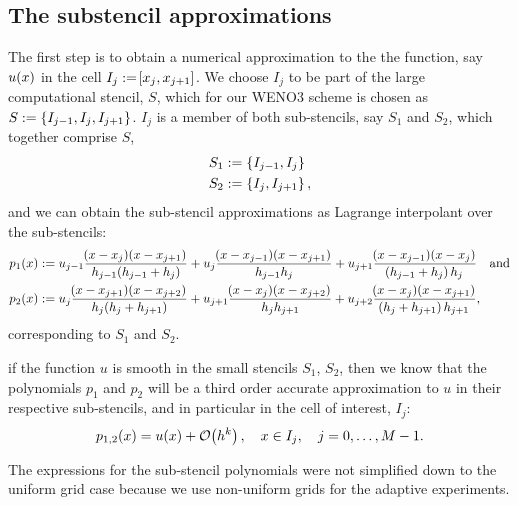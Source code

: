 \documentclass{amsart}
\theoremstyle{definition}
\theoremstyle{remark}
\numberwithin{equation}{section}
\begin{document}
	\subsection{The substencil approximations}
 The first step is to obtain a numerical approximation to the the function, say  $u\!\left({x}\right)$ in the cell $I_j:=\!\left[{x_j, x_{j+1}}\right]$. We choose $I_j$ to be part of the large computational stencil, $S$, which for our WENO3 scheme is  chosen as $S:=\left\lbrace I_{j-1}, I_j, I_{j+1}\right\rbrace$.  $I_j$ is a member of both sub-stencils, say $S_1$ and $S_2$, which together comprise $S$,
	\begin{equation}
		\begin{aligned}
			S_1&:=\left\lbrace I_{j-1}, I_j\right\rbrace\\
			S_2&:=\left\lbrace I_{j}, I_{j+1}\right\rbrace,
		\end{aligned}
	\end{equation}
and we can obtain the sub-stencil approximations as Lagrange interpolant over the sub-stencils:
\begin{equation}
	\begin{aligned}
		p_1\qp{x}&:= u_{j-1}\frac{\qp{x-x_{j}}\qp{x-x_{j+1}}}{h_{j-1}\qp{h_{j-1}+h_j}} + 
		u_{j}\frac{\qp{x-x_{j-1}}\qp{x-x_{j+1}}}{h_{j-1}h_j}  +
		u_{j+1}\frac{\qp{x-x_{j-1}}\qp{x-x_{j}}}{\qp{h_{j-1}+h_j}h_j}\quad\text{and} \\
		p_2\qp{x}&:= u_{j}\frac{\qp{x-x_{j+1}}\qp{x-x_{j+2}}}{h_{j}\qp{h_{j}+h_{j+1}}} + 
		u_{j+1}\frac{\qp{x-x_{j}}\qp{x-x_{j+2}}}{h_{j}h_{j+1}}  +
		u_{j+2}\frac{\qp{x-x_{j}}\qp{x-x_{j+1}}}{\qp{h_{j}+h_{j+1}}h_{j+1}},
	\end{aligned}
\end{equation}
corresponding to $S_1$ and $S_2$.
	\begin{Rem}   if the function $u$ is smooth in the small stencils $S_1$, $S_2$, then we know that  the polynomials $p_1$ and $p_2$ will be a third order accurate approximation to $u$ in their respective sub-stencils, and in particular in the cell of interest, $I_j$:
		\begin{equation}
			p_{1,2}\!\left({x}\right) = u\!\left({x}\right) + \mathcal{O}\!\left({h^k}\right), \quad x\in I_j, \quad j=0,\dots,M-1.
		\end{equation}
	\end{Rem}
	\begin{Rem} The expressions for the sub-stencil polynomials were not simplified down to the uniform grid case  because we use non-uniform grids for the adaptive experiments.
\end{Rem}
\end{document}
